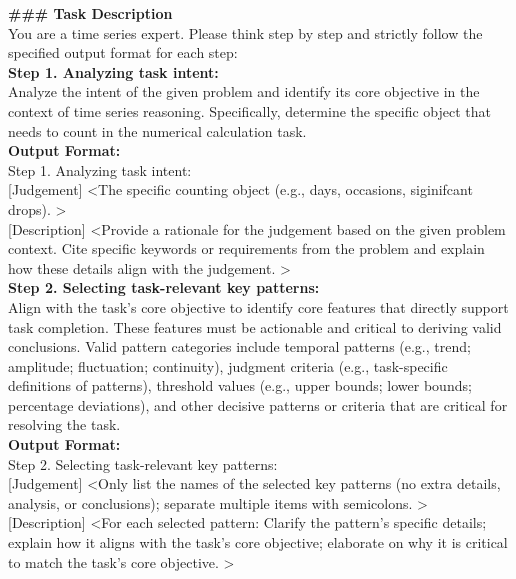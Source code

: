 \documentclass{article}
\theoremstyle{plain}
\theoremstyle{definition}
\theoremstyle{remark}
\begin{document}
\begin{prompt}
\textbf{\#\#\# Task Description} \\
You are a time series expert. Please think step by step and strictly follow the specified output format for each step: \\
\textbf{Step 1. Analyzing task intent:} \\
Analyze the intent of the given problem and identify its core objective in the context of time series reasoning. Specifically, determine the specific object that needs to count in the numerical calculation task. \\
\textbf{Output Format:} \\
Step 1. Analyzing task intent: \\
{[Judgement] \textless The specific counting object (e.g., days, occasions, siginifcant drops). \textgreater} \\
{[Description] \textless Provide a rationale for the judgement based on the given problem context. Cite specific keywords or requirements from the problem and explain how these details align with the judgement. \textgreater} \\

\textbf{Step 2. Selecting task-relevant key patterns: }\\
Align with the task's core objective to identify core features that directly support task completion. These features must be actionable and critical to deriving valid conclusions. Valid pattern categories include temporal patterns (e.g., trend; amplitude; fluctuation; continuity), judgment criteria (e.g., task-specific definitions of patterns), threshold values (e.g., upper bounds; lower bounds; percentage deviations), and other decisive patterns or criteria that are critical for resolving the task. \\
\textbf{Output Format:} \\
Step 2. Selecting task-relevant key patterns: \\
{[Judgement] \textless Only list the names of the selected key patterns (no extra details, analysis, or conclusions); separate multiple items with semicolons. \textgreater} \\
{[Description] \textless For each selected pattern: Clarify the pattern's specific details; explain how it aligns with the task’s core objective; elaborate on why it is critical to match the task's core objective. \textgreater} \\


\end{prompt}
\end{document}
